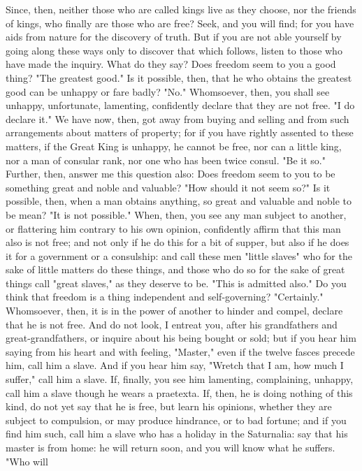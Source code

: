 \documentclass[a4paper]{article}
\begin{document}
    Since, then, neither those who are called kings live as they choose, nor
the friends of kings, who finally are those who are free? Seek, and you will
find; for you have aids from nature for the discovery of truth. But if you are
not able yourself by going along these ways only to discover that which
follows, listen to those who have made the inquiry. What do they say? Does
freedom seem to you a good thing? "The greatest good." Is it possible, then,
that he who obtains the greatest good can be unhappy or fare badly? "No."
Whomsoever, then, you shall see unhappy, unfortunate, lamenting, confidently
declare that they are not free. "I do declare it." We have now, then, got away
from buying and selling and from such arrangements about matters of property;
for if you have rightly assented to these matters, if the Great King is
unhappy, he cannot be free, nor can a little king, nor a man of consular rank,
nor one who has been twice consul. "Be it so."
    Further, then, answer me this question also: Does freedom seem to you to be
something great and noble and valuable? "How should it not seem so?" Is it
possible, then, when a man obtains anything, so great and valuable and noble to
be mean? "It is not possible." When, then, you see any man subject to another,
or flattering him contrary to his own opinion, confidently affirm that this man
also is not free; and not only if he do this for a bit of supper, but also if
he does it for a government or a consulship: and call these men "little slaves"
who for the sake of little matters do these things, and those who do so for the
sake of great things call "great slaves," as they deserve to be. "This is
admitted also." Do you think that freedom is a thing independent and
self-governing? "Certainly." Whomsoever, then, it is in the power of another to
hinder and compel, declare that he is not free. And do not look, I entreat you,
after his grandfathers and great-grandfathers, or inquire about his being
bought or sold; but if you hear him saying from his heart and with feeling,
"Master," even if the twelve fasces precede him, call him a slave. And if you
hear him say, "Wretch that I am, how much I suffer," call him a slave. If,
finally, you see him lamenting, complaining, unhappy, call him a slave though
he wears a praetexta. If, then, he is doing nothing of this kind, do not yet
say that he is free, but learn his opinions, whether they are subject to
compulsion, or may produce hindrance, or to bad fortune; and if you find him
such, call him a slave who has a holiday in the Saturnalia: say that his master
is from home: he will return soon, and you will know what he suffers. "Who will
\end{document}
